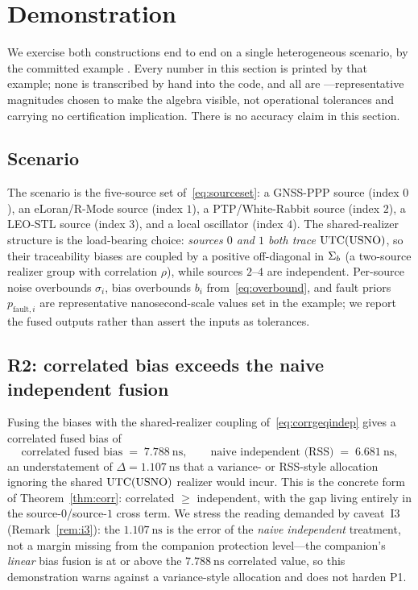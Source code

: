 \section{Demonstration}
\label{sec:demo}

We exercise both constructions end to end on a single heterogeneous scenario, by
the committed example . Every number in this
section is printed by that example; none is transcribed by hand into the code, and
all are \Modelled{}---representative magnitudes chosen to make the algebra visible,
not operational tolerances and carrying no certification implication. There is no
accuracy claim in this section.

\subsection{Scenario}
\label{sec:demoscenario}

The scenario is the five-source set of~\eqref{eq:sourceset}: a GNSS-PPP source
(index $0$), an eLoran/R-Mode source (index $1$), a PTP/White-Rabbit source
(index $2$), a LEO-STL source (index $3$), and a local oscillator (index $4$). The
shared-realizer structure is the load-bearing choice: \emph{sources $0$ and $1$
both trace $\mathrm{UTC}{}(\mathrm{USNO})$}, so their traceability biases are coupled by a
positive off-diagonal in $\Sigma_{b}{}$ (a two-source realizer group with correlation
$\rho$), while sources $2$--$4$ are independent. Per-source noise overbounds
$\sigma_i$, bias overbounds $b_i$ from~\eqref{eq:overbound}, and fault priors
$p_{\mathrm{fault},i}$ are representative nanosecond-scale values set in the
example; we report the fused outputs rather than assert the inputs as tolerances.

\subsection{R2: correlated bias exceeds the naive independent fusion}
\label{sec:demor2}

Fusing the biases with the shared-realizer coupling of~\eqref{eq:corrgeqindep}
gives a correlated fused bias of
\begin{equation}
  \text{correlated fused bias} \;=\; \SI{7.788}{\nano\second},
  \qquad
  \text{naive independent (RSS)} \;=\; \SI{6.681}{\nano\second},
  \label{eq:demor2}
\end{equation}
an understatement of $\Delta=\SI{1.107}{\nano\second}$ that a variance- or RSS-style
allocation ignoring the shared $\mathrm{UTC}{}(\mathrm{USNO})$ realizer would incur. This is
the concrete form of Theorem~\ref{thm:corr}: correlated $\ge$ independent, with the
gap living entirely in the source-$0$/source-$1$ cross term. We stress the reading
demanded by caveat~I3 (Remark~\ref{rem:i3}): the $\SI{1.107}{\nano\second}$ is the
error of the \emph{naive independent} treatment, not a margin missing from the
companion protection level---the companion's \emph{linear} bias fusion is at or
above the $\SI{7.788}{\nano\second}$ correlated value, so this demonstration warns
against a variance-style allocation and does not harden P1.


